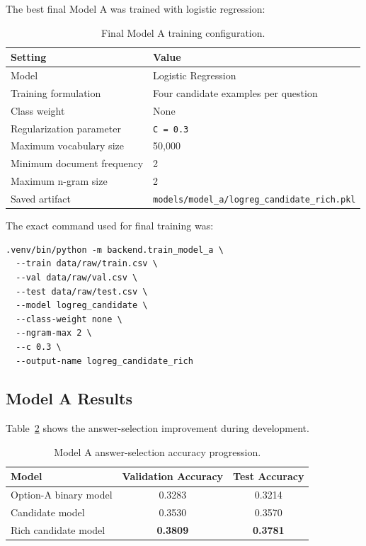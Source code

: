 \documentclass[12pt,a4paper]{article}
\begin{document}
The best final Model A was trained with logistic regression:

\begin{table}[H]
\centering
\caption{Final Model A training configuration.}
\label{tab:model-a-config}
\begin{tabular}{ll}
\toprule
\textbf{Setting} & \textbf{Value} \\
\midrule
Model & Logistic Regression \\
Training formulation & Four candidate examples per question \\
Class weight & None \\
Regularization parameter & \texttt{C = 0.3} \\
Maximum vocabulary size & 50,000 \\
Minimum document frequency & 2 \\
Maximum n-gram size & 2 \\
Saved artifact & \texttt{models/model\_a/logreg\_candidate\_rich.pkl} \\
\bottomrule
\end{tabular}
\end{table}

The exact command used for final training was:

\begin{verbatim}
.venv/bin/python -m backend.train_model_a \
  --train data/raw/train.csv \
  --val data/raw/val.csv \
  --test data/raw/test.csv \
  --model logreg_candidate \
  --class-weight none \
  --ngram-max 2 \
  --c 0.3 \
  --output-name logreg_candidate_rich
\end{verbatim}

\subsection{Model A Results}

Table~\ref{tab:model-a-progression} shows the answer-selection improvement
during development.

\begin{table}[H]
\centering
\caption{Model A answer-selection accuracy progression.}
\label{tab:model-a-progression}
\begin{tabular}{lcc}
\toprule
\textbf{Model} & \textbf{Validation Accuracy} & \textbf{Test Accuracy} \\
\midrule
Option-A binary model & 0.3283 & 0.3214 \\
Candidate model & 0.3530 & 0.3570 \\
Rich candidate model & \textbf{0.3809} & \textbf{0.3781} \\
\bottomrule
\end{tabular}
\end{table}
\end{document}
